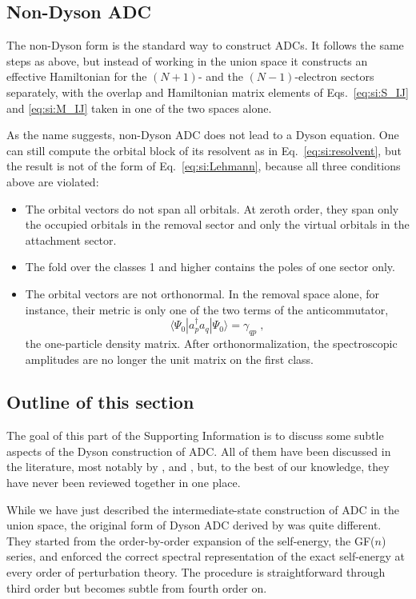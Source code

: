 \documentclass[aip,jcp,reprint,noshowkeys,superscriptaddress]{revtex4-2}
\theoremstyle{plain}
\theoremstyle{definition}
\theoremstyle{remark}
\begin{document}
\subsection{\label{sec:si:nondyson}Non-Dyson ADC}
The non-Dyson form is the standard way to construct ADCs. It follows the same steps as above, but instead of working in the union space it constructs an effective Hamiltonian for the $(N+1)$- and the $(N-1)$-electron sectors separately, with the overlap and Hamiltonian matrix elements of Eqs.~\eqref{eq:si:S_IJ} and \eqref{eq:si:M_IJ} taken in one of the two spaces alone.

As the name suggests, non-Dyson ADC does not lead to a Dyson equation. One can still compute the orbital block of its resolvent as in Eq.~\eqref{eq:si:resolvent}, but the result is not of the form of Eq.~\eqref{eq:si:Lehmann}, because all three conditions above are violated:
\begin{itemize}
\item The orbital vectors do not span all orbitals. At zeroth order, they span only the occupied orbitals in the removal sector and only the virtual orbitals in the attachment sector.
\item The fold over the classes 1 and higher contains the poles of one sector only.
\item The orbital vectors are not orthonormal. In the removal space alone, for instance, their metric is only one of the two terms of the anticommutator,
\begin{equation}
\langle\Psi_0|a_p^\dagger a_q|\Psi_0\rangle=\gamma_{qp} \;,
\end{equation}
the one-particle density matrix. After orthonormalization, the spectroscopic amplitudes are no longer the unit matrix on the first class.
\end{itemize}

\subsection{Outline of this section}
The goal of this part of the Supporting Information is to discuss some subtle aspects of the Dyson construction of ADC. All of them have been discussed in the literature, most notably by \citet{Schirmer_1983}, \citet{tarantelli1992configuration} and \citet{Mertins_1996b}, but, to the best of our knowledge, they have never been reviewed together in one place.

While we have just described the intermediate-state construction of ADC in the union space, the original form of Dyson ADC derived by \citet{Schirmer_1983} was quite different. They started from the order-by-order expansion of the self-energy, the GF($n$) series, and enforced the correct spectral representation of the exact self-energy at every order of perturbation theory. The procedure is straightforward through third order but becomes subtle from fourth order on.
\end{document}
